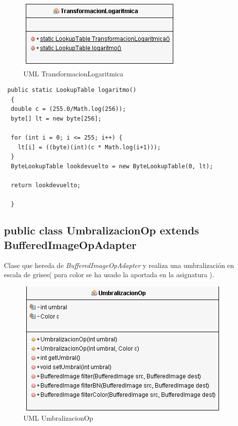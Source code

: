 \begin{figure}[H]
  \centering
    \includegraphics[scale=0.75]{images/logaritmica}
  \caption{UML TransformacionLogaritmica}
  \label{UML TransformacionLogaritmica}
\end{figure}

\begin{lstlisting}
 public static LookupTable logaritmo()
  {
  double c = (255.0/Math.log(256));
  byte[] lt = new byte[256];
    
  for (int i = 0; i <= 255; i++) {
    lt[i] = ((byte)(int)(c * Math.log(i+1)));
  }
  ByteLookupTable lookdevuelto = new ByteLookupTable(0, lt);
    
  return lookdevuelto;
    
  }
\end{lstlisting}  

\subsection*{public class UmbralizacionOp extends BufferedImageOpAdapter}
Clase que hereda de \emph{BufferedImageOpAdapter} y realiza una umbralización en escala de grises( para color se ha usado la aportada en la asignatura ).

\begin{figure}[H]
  \centering
    \includegraphics[scale=0.75]{images/umbralizacion}
  \caption{UML UmbralizacionOp}
  \label{UML UmbralizacionOp}
\end{figure}

